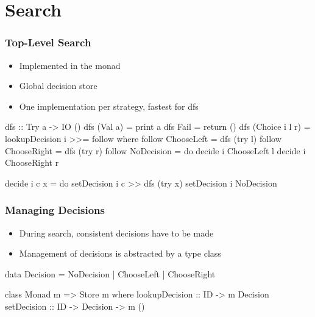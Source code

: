 \documentclass[
,hyperref={pdfpagelabels=false}
]{beamer}
\begin{document}

\section{Search}

\begin{frame}[fragile]%
\frametitle{Top-Level Search}

\begin{itemize}
  \item Implemented in the  monad
  \item Global decision store
  \item One implementation per strategy, fastest for dfs
\end{itemize}

\begin{haskell}
dfs :: Try a -> IO ()
dfs (Val a)        = print a
dfs Fail           = return ()
dfs (Choice i l r) = lookupDecision i >>= follow
  where
  follow ChooseLeft  = dfs (try l)
  follow ChooseRight = dfs (try r)
  follow NoDecision  = do decide i ChooseLeft  l
                          decide i ChooseRight r

  decide i c x = do setDecision i c >> dfs (try x)
                    setDecision i NoDecision
\end{haskell}
\end{frame}

\begin{frame}[fragile]%
\frametitle{Managing Decisions}
\begin{itemize}
\item During search, consistent decisions have to be made
\item Management of decisions is abstracted by a type class
\end{itemize}

\begin{haskell}
data Decision = NoDecision
              | ChooseLeft
              | ChooseRight

class Monad m => Store m where
  lookupDecision :: ID -> m Decision
  setDecision    :: ID -> Decision -> m ()
\end{haskell}
\end{frame}
\end{document}
